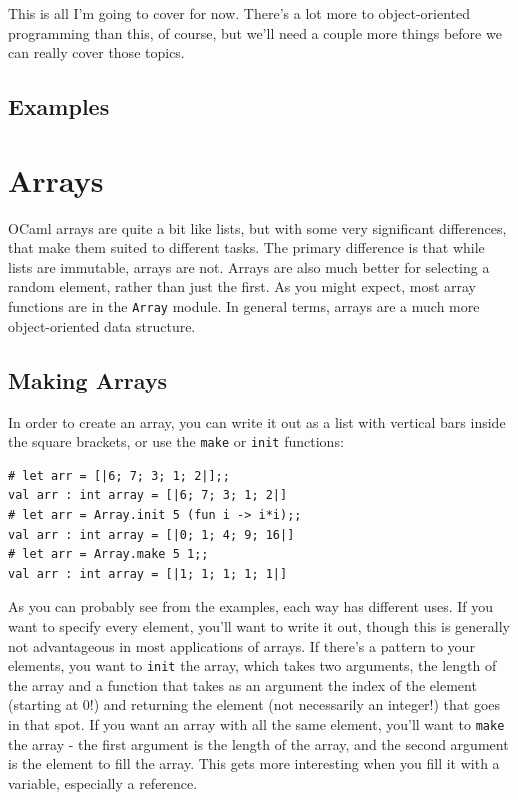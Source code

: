 \documentclass[10pt]{book}
\begin{document}
{This is all I'm going to cover for now. There's a lot more to object-oriented 
programming than this, of course, but we'll need a couple more things before
we can really cover those topics.

\section{Examples}


\chapter{Arrays}

OCaml arrays are quite a bit like lists, but with some very significant
differences, that make them suited to different tasks. The primary difference
is that while lists are immutable, arrays are not. Arrays are also much better
for selecting a random element, rather than just the first. As you might expect,
most array functions are in the {\tt Array} module. In general terms, arrays are 
a much more object-oriented data structure.

\section{Making Arrays}

In order to create an array, you can write it out as a list with vertical bars inside the square brackets, or use the {\tt make} or {\tt init} functions:

\beforeverb
\begin{verbatim}
# let arr = [|6; 7; 3; 1; 2|];;
val arr : int array = [|6; 7; 3; 1; 2|]
# let arr = Array.init 5 (fun i -> i*i);;
val arr : int array = [|0; 1; 4; 9; 16|]
# let arr = Array.make 5 1;;
val arr : int array = [|1; 1; 1; 1; 1|]
\end{verbatim}
\afterverb
As you can probably see from the examples, each way has different uses. If you want to specify every element, you'll want to write it out, though this is generally not advantageous in most applications of arrays. If there's a pattern to your elements, you want to {\tt init} the array, which takes two arguments, the length of the array and a function that takes as an argument the index of the element (starting at 0!) and returning the element (not necessarily an integer!) that goes in that spot. If you want an array with all the same element, you'll want to {\tt make} the array - the first argument is the length of the array, and the second argument is the element to fill the array. This gets more interesting when you fill it with a variable, especially a reference.

}
\end{document}

